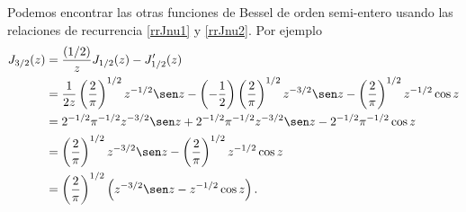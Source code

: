 Podemos encontrar las otras funciones de Bessel de orden semi-entero usando las relaciones de recurrencia \eqref{rrJnu1} y \eqref{rrJnu2}. Por ejemplo
\begin{align}
    J_{3/2}(z)
    &= \frac{(1/2)}{z} J_{1/2}(z) - J_{1/2}'(z) 
    \\
    &= \frac{1}{2z} \left( \frac{2}{\pi} \right)^{1/2} z^{-1/2} \sen z
    - \left(-\frac{1}{2}\right) \left(\frac{2}{\pi}\right)^{1/2}
    z^{-3/2} \sen z - \left(\frac{2}{\pi}\right)^{1/2} z^{-1/2}
    \cos z 
    \\
    &= 2^{-1/2} \pi^{-1/2} z^{-3/2} \sen z
    + 2^{-1/2} \pi^{-1/2} z^{-3/2} \sen z
    - 2^{-1/2} \pi^{-1/2} \cos z 
    \\
    &= \left(\frac{2}{\pi}\right)^{1/2} z^{-3/2} \sen z
    - \left(\frac{2}{\pi}\right)^{1/2} z^{-1/2} \cos z 
    \\
    &= \left(\frac{2}{\pi}\right)^{1/2} \left( z^{-3/2} \sen z
      - z^{-1/2} \cos z \right).
  \end{align}



